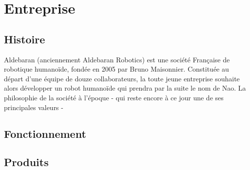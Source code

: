 \chapter*{Entreprise}
\label{Entreprise}
\thispagestyle{fancy}

\section{Histoire}
\label{Entreprise: histoire}
Aldebaran (anciennement Aldebaran Robotics) est une société Française de robotique humanoïde, fondée en 2005 par Bruno Maisonnier. 
Constituée au départ d'une équipe de douze collaborateurs, la toute jeune entreprise souhaite alors développer un robot humanoïde qui prendra par la suite le nom de Nao. La philosophie de la société à l'époque - qui reste encore à ce jour une de ses principales valeurs  -

\section{Fonctionnement}

\section{Produits}
